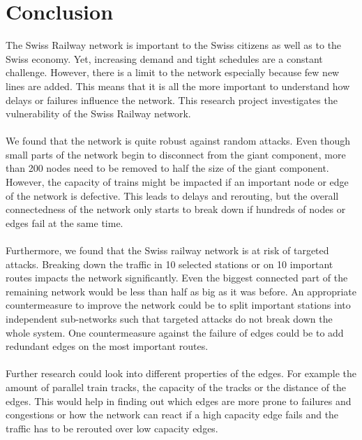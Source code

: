 \documentclass{Resources/netsci-project}
\begin{document}
\section{Conclusion}
The Swiss Railway network is important to the Swiss citizens as well as to the Swiss economy. Yet, increasing demand and tight schedules are a constant challenge. However, there is a limit to the network especially because few new lines are added. This means that it is all the more important to understand how delays or failures influence the network. This research project investigates the vulnerability of the Swiss Railway network. 
\\~\\
We found that the network is quite robust against random attacks. Even though small parts of the network begin to disconnect from the giant component, more than 200 nodes need to be removed to half the size of the giant component. However, the capacity of trains might be impacted if an important node or edge of the network is defective. This leads to delays and rerouting, but the overall connectedness of the network only starts to break down if hundreds of nodes or edges fail at the same time.
\\~\\
Furthermore, we found that the Swiss railway network is at risk of targeted attacks. Breaking down the traffic in 10 selected stations or on 10 important routes impacts the network significantly. Even the biggest connected part of the remaining network would be less than half as big as it was before. An appropriate countermeasure to improve the network could be to split important stations into independent sub-networks such that targeted attacks do not break down the whole system. One countermeasure against the failure of edges could be to add redundant edges on the most important routes.
\\~\\
Further research could look into different properties of the edges. For example the amount of parallel train tracks, the capacity of the tracks or the distance of the edges. This would help in finding out which edges are more prone to failures and congestions or how the network can react if a high capacity edge fails and the traffic has to be rerouted over low capacity edges. 

\printbibliography
\end{document}
